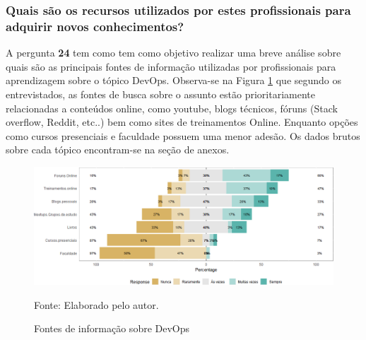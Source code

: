 \documentclass[twoside,english,brazilian]{UNISINOSartigo}
\newcommand{\source}[1]{\caption*{Fonte: {#1}} }
\begin{document}
\subsubsection{Quais são os recursos  utilizados por estes profissionais para adquirir novos conhecimentos?}
A pergunta \textbf{24} tem como tem como objetivo realizar uma breve análise sobre quais são as principais fontes de informação utilizadas por profissionais para aprendizagem sobre o tópico DevOps. Observa-se na Figura \ref{fig:fontesConhecimento} que segundo os entrevistados, as fontes de busca sobre o assunto estão prioritariamente relacionadas a conteúdos online, como youtube, blogs técnicos, fóruns (Stack overflow,  Reddit, etc..) bem como sites de treinamentos Online. Enquanto opções como cursos presenciais e faculdade possuem uma menor adesão. Os dados brutos sobre cada tópico encontram-se na seção de anexos.
\begin{figure}[H]
    \centering
    \caption{Fontes de informação sobre DevOps}
       \includegraphics[scale=.5]{imagens/questao24.png}
       \source{Elaborado pelo autor.}
    \label{fig:fontesConhecimento}
\end{figure}
\end{document}
